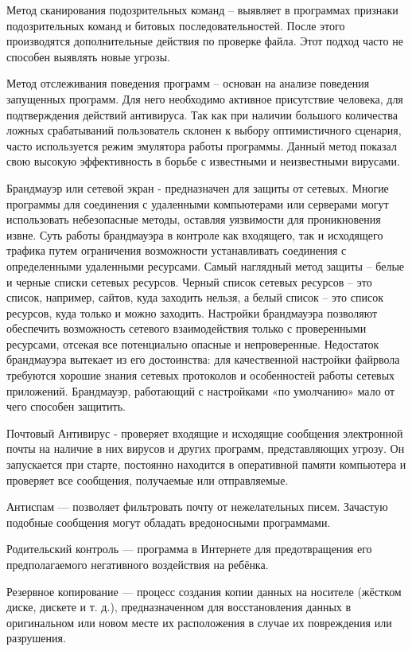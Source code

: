 \documentclass[%
preprint,
amsmath,amssymb,
aps,
]{revtex4-2}
\begin{document}
	$\textbf{Метод сканирования подозрительных команд}$ – выявляет в программах признаки подозрительных команд и битовых последовательностей. После этого производятся дополнительные действия по проверке файла. Этот подход часто не способен выявлять новые угрозы.

$\textbf{Метод отслеживания поведения программ}$ – основан на анализе поведения запущенных программ. Для него необходимо активное присутствие человека, для подтверждения действий антивируса. Так как при наличии большого количества ложных срабатываний пользователь склонен к выбору оптимистичного сценария, часто используется режим эмулятора работы программы. Данный метод показал свою высокую эффективность в борьбе с известными и неизвестными вирусами.

$\textbf{Брандмауэр или сетевой экран}$ - предназначен для защиты от сетевых. Многие программы для соединения с удаленными компьютерами или серверами могут использовать небезопасные методы, оставляя уязвимости для проникновения извне. Суть работы брандмауэра в контроле как входящего, так и исходящего трафика путем ограничения возможности устанавливать соединения с определенными удаленными ресурсами. Самый наглядный метод защиты – белые и черные списки сетевых ресурсов. Черный список сетевых ресурсов – это список, например, сайтов, куда заходить нельзя, а белый список – это список ресурсов, куда только и можно заходить. Настройки брандмауэра позволяют обеспечить возможность сетевого взаимодействия только с проверенными ресурсами, отсекая все потенциально опасные и непроверенные. Недостаток брандмауэра вытекает из его достоинства: для качественной настройки файрвола требуются хорошие знания сетевых протоколов и особенностей работы сетевых приложений. Брандмауэр, работающий с настройками «по умолчанию» мало от чего способен защитить.

$\textbf{Почтовый Антивирус}$ - проверяет входящие и исходящие сообщения электронной почты на наличие в них вирусов и других программ, представляющих угрозу. Он запускается при старте, постоянно находится в оперативной памяти компьютера и проверяет все сообщения, получаемые или отправляемые.

$\textbf{Антиспам}$ — позволяет фильтровать почту от нежелательных писем. Зачастую подобные сообщения могут обладать вредоносными программами.

$\textbf{Родительский контроль}$ — программа в Интернете для предотвращения его предполагаемого негативного воздействия на ребёнка.

$\textbf{Резервное копирование}$ — процесс создания копии данных на носителе (жёстком диске, дискете и т. д.), предназначенном для восстановления данных в оригинальном или новом месте их расположения в случае их повреждения или разрушения.
\end{document}
